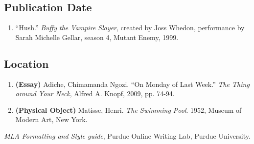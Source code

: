 \documentclass[12pt]{article} %
\begin{document}
\subsection*{Publication Date}
\begin{enumerate}
  \item “Hush.” \textit{Buffy the Vampire Slayer}, created by Joss Whedon, performance by Sarah Michelle Gellar, season 4, Mutant Enemy, 1999.
\end{enumerate}

\subsection*{Location}
\begin{enumerate}
  \item \textbf{(Essay)} Adiche, Chimamanda Ngozi. “On Monday of Last Week.”\textit{ The Thing around Your Neck}, Alfred A. Knopf, 2009, pp. 74-94.
  \item \textbf{(Physical Object)} Matisse, Henri. \textit{The Swimming Pool}. 1952, Museum of Modern Art, New York.
\end{enumerate}

\vspace*{15cm}



\textit{MLA Formatting and Style guide}, Purdue Online Writing Lab, Purdue University.\\
\end{document}
